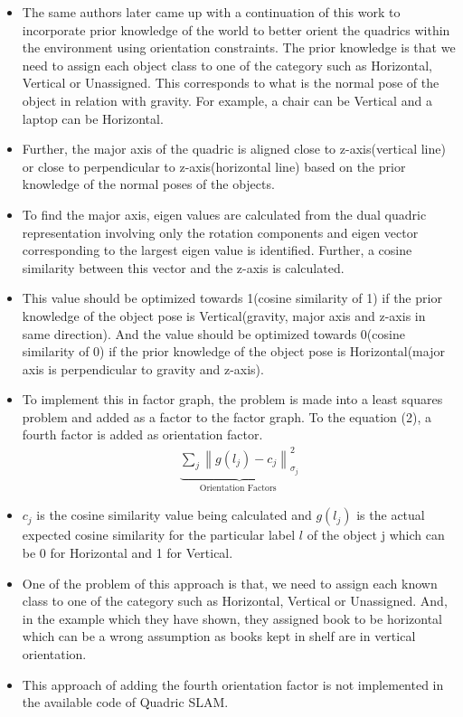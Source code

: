 \documentclass{article}
\begin{document}
\begin{itemize}
\item The same authors later came up with a continuation of this work to incorporate prior knowledge of the world to better orient the quadrics within the environment using orientation constraints\cite{orientation_factor}. The prior knowledge is that we need to assign each object class to one of the category such as Horizontal, Vertical or Unassigned. This corresponds to what is the normal pose of the object in relation with gravity. For example, a chair can be Vertical and a laptop can be Horizontal.
\item Further, the major axis of the quadric is aligned close to z-axis(vertical line) or close to perpendicular to z-axis(horizontal line) based on the prior knowledge of the normal poses of the objects. 
\item To find the major axis, eigen values are calculated from the dual quadric representation involving only the rotation components and eigen vector corresponding to the largest eigen value is identified. Further, a cosine similarity between this vector and the z-axis is calculated.
\item This value should be optimized towards 1(cosine similarity of 1) if the prior knowledge of the object pose is Vertical(gravity, major axis and z-axis in same direction). And the value should be optimized towards 0(cosine similarity of 0) if the prior knowledge of the object pose is Horizontal(major axis is perpendicular to gravity and z-axis).
\item To implement this in factor graph, the problem is made into a least squares problem and added as a factor to the factor graph. To the equation (2), a fourth factor is added as orientation factor.
\begin{equation}
{
\begin{aligned}
\underbrace{\sum_{j}\left\|g\left(l_{j}\right)-c_{j}\right\|_{\sigma_{j}}^{2}}_{\text {Orientation Factors }}
\end{aligned}
}
\end{equation}

\item $c_j$ is the cosine similarity value being calculated and $g(l_j)$ is the actual expected cosine similarity for the particular label $l$ of the object j which can be 0 for Horizontal and 1 for Vertical.

\item One of the problem of this approach is that, we need to assign each known class to one of the category such as Horizontal, Vertical or Unassigned. And, in the example which they have shown, they assigned book to be horizontal which can be a wrong assumption as books kept in shelf are in vertical orientation.
\item This approach of adding the fourth orientation factor is not implemented in the available code of Quadric SLAM.



\end{itemize}
\end{document}
